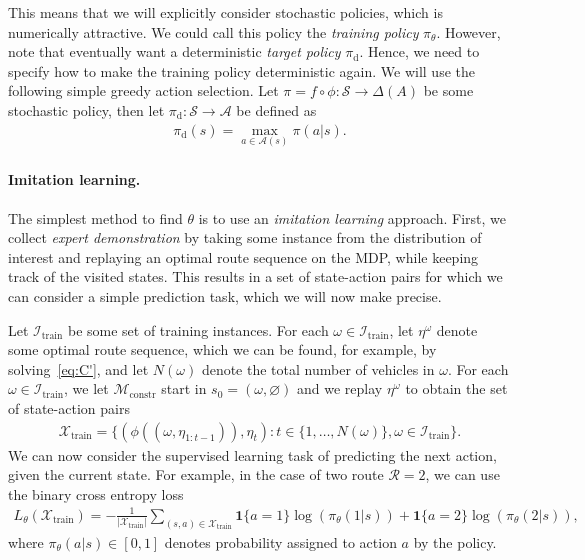 \documentclass[a4paper]{report}
\theoremstyle{definition}
\theoremstyle{plain}
\begin{document}
This means that we will explicitly consider stochastic policies, which is
numerically attractive.
%
We could call this policy the \emph{training policy} $\pi_\theta$.
%
However, note that eventually want a deterministic \emph{target policy} $\pi_\mathrm{d}$. Hence,
we need to specify how to make the training policy deterministic again. We will
use the following simple greedy action selection. Let
$\pi = f \circ \phi : \mathcal{S} \rightarrow \Delta(A)$ be some stochastic
policy, then let $\pi_\mathrm{d} : \mathcal{S} \rightarrow \mathcal{A}$ be
defined as
\begin{align} 
  \pi_\mathrm{d}(s) = \max_{a \in \mathcal{A}(s)} \pi(a | s).
\end{align}

\paragraph{Imitation learning.}

The simplest method to find $\theta$ is to use an \emph{imitation learning} approach.
%
First, we collect \emph{expert demonstration} by taking some instance from the
distribution of interest and replaying an optimal route sequence on the MDP,
while keeping track of the visited states. This results in a set of state-action
pairs for which we can consider a simple prediction task, which we will now make
precise.

Let $\mathcal{I}_\mathrm{train}$ be some set of training instances. For each
$\omega \in \mathcal{I}_\mathrm{train}$, let $\eta^\omega$ denote some optimal
route sequence, which we can be found, for example, by solving~\eqref{eq:C'},
and let $N(\omega)$ denote the total number of vehicles in $\omega$.
%
For each $\omega \in \mathcal{I}_\mathrm{train}$, we let
$\mathcal{M}_\mathrm{constr}$ start in $s_0 = (\omega, \varnothing)$ and we
replay $\eta^\omega$ to obtain the set of state-action pairs
\begin{align}
  \label{eq:2}
  \mathcal{X}_\mathrm{train} = \{ (\phi((\omega, \eta_{1:t-1})), \eta_{t}): t \in \{1, \dots, N(\omega) \} , \omega \in \mathcal{I}_\mathrm{train}\} .
\end{align}
%
We can now consider the supervised learning task of predicting the next action, given the current state.
%
For example, in the case of two route $\mathcal{R} = 2$, we can use the binary
cross entropy loss
\begin{align}
  L_\theta(\mathcal{X}_\mathrm{train}) = -\frac{1}{|\mathcal{X}_\mathrm{train}|} \sum_{(s,a) \in \mathcal{X}_\mathrm{train}} \mathbf{1}\{a = 1\} \log(\pi_\theta(1 | s)) + \mathbf{1}\{a = 2\}\log( \pi_\theta(2 | s) ) ,
\end{align}
where $\pi_\theta(a | s) \in [0,1]$ denotes probability assigned to action $a$
by the policy.
\end{document}
